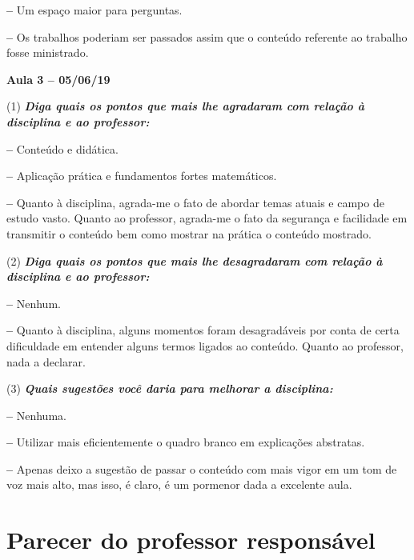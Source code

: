 \documentclass[
	12pt,				%
	openright,			%
	oneside,			%
	a4paper,			%
	chapter=TITLE,		%
	section=TITLE,		%
	english,			%
	french,				%
	spanish,			%
	brazil				%
	]{abntex2}
\begin{document}
\textbf{--} Um espaço maior para perguntas.

\textbf{--} Os trabalhos poderiam ser passados assim que o conteúdo referente ao trabalho fosse ministrado.


\vspace{1cm}

\textbf{Aula 3 -- 05/06/19}

(1) \textit{\textbf{Diga quais os pontos que mais lhe agradaram com relação à disciplina e ao professor:}}

\textbf{--} Conteúdo e didática.

\textbf{--} Aplicação prática e fundamentos fortes matemáticos.

\textbf{--} Quanto à disciplina, agrada-me o fato de abordar temas atuais e campo de estudo vasto. Quanto ao professor, agrada-me o fato da segurança e facilidade em transmitir o conteúdo bem como mostrar na prática o conteúdo mostrado.

(2) \textit{\textbf{Diga quais os pontos que mais lhe desagradaram com relação à disciplina e ao professor:}}

\textbf{--} Nenhum.

\textbf{--} Quanto à disciplina, alguns momentos foram desagradáveis por conta de certa dificuldade em entender alguns termos ligados ao conteúdo. Quanto ao professor, nada a declarar.

(3) \textit{\textbf{Quais sugestões você daria para melhorar a disciplina:}}

\textbf{--} Nenhuma.

\textbf{--} Utilizar mais eficientemente o quadro branco em explicações abstratas.

\textbf{--} Apenas deixo a sugestão de passar o conteúdo com mais vigor em um tom de voz mais alto, mas isso, é claro, é um pormenor dada a excelente aula.

\newpage
\chapter{Parecer do professor responsável}

\postextual
\newpage


%
%
\end{document}
